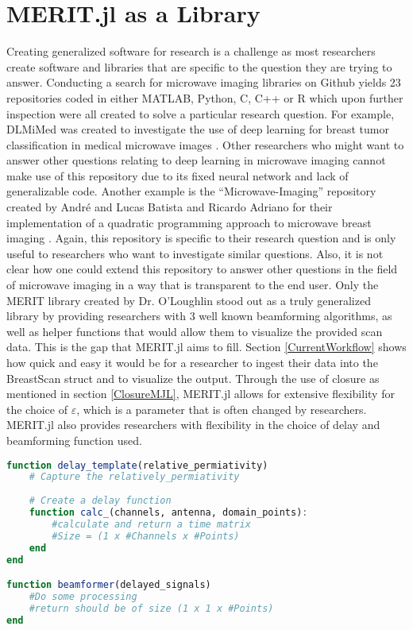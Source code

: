 \section{MERIT.jl as a Library}
\label{MERITAsLibrary}
Creating generalized software for research is a challenge as most researchers create software and libraries that are
specific to the question they are trying to answer. Conducting a search for microwave imaging libraries on Github yields
23 repositories coded in either MATLAB, Python, C, C++ or R which upon further inspection were all created to solve a
particular research question. For example, DLMiMed was created to investigate the use of deep learning for breast tumor
classification in medical microwave images \cite{gerazovDLMiMed17}. Other researchers who might want to answer other
questions relating to deep learning in microwave imaging cannot make use of this repository due to its fixed neural
network and lack of generalizable code. Another example is the ``Microwave-Imaging'' repository created by André and
Lucas Batista and Ricardo Adriano for their implementation of a quadratic programming approach to microwave breast
imaging \cite{batistaMicrowaveImaging21}. Again, this repository is specific to their research question and is only
useful to researchers who want to investigate similar questions. Also, it is not clear how one could extend this
repository to answer other questions in the field of microwave imaging in a way that is transparent to the end user.
Only the MERIT library created by Dr. O'Loughlin stood out as a truly generalized library by providing researchers with
3 well known beamforming algorithms, as well as helper functions that would allow them to visualize the provided scan
data. This is the gap that MERIT.jl aims to fill. Section \ref{CurrentWorkflow} shows how quick and easy it would be for
a researcher to ingest their data into the BreastScan struct and to visualize the output. Through the use of closure as
mentioned in section \ref{ClosureMJL}, MERIT.jl allows for extensive flexibility for the choice of $\varepsilon$, which
is a parameter that is often changed by researchers. MERIT.jl also provides researchers with flexibility in the choice
of delay and beamforming function used. 
\begin{lstlisting}[language=Julia]
function delay_template(relative_permiativity)
    # Capture the relatively_permiativity
    
    # Create a delay function
    function calc_(channels, antenna, domain_points):
        #calculate and return a time matrix
        #Size = (1 x #Channels x #Points)
    end
end

function beamformer(delayed_signals)
    #Do some processing
    #return should be of size (1 x 1 x #Points)
end
\end{lstlisting}
